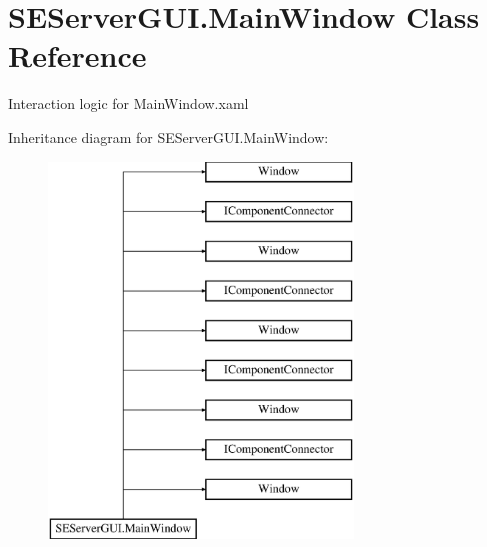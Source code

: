 \hypertarget{class_s_e_server_g_u_i_1_1_main_window}{}\section{S\+E\+Server\+G\+U\+I.\+Main\+Window Class Reference}
\label{class_s_e_server_g_u_i_1_1_main_window}


Interaction logic for Main\+Window.\+xaml  


Inheritance diagram for S\+E\+Server\+G\+U\+I.\+Main\+Window\+:\begin{figure}[H]
\begin{center}
\leavevmode
\includegraphics[height=10.000000cm]{class_s_e_server_g_u_i_1_1_main_window}
\end{center}
\end{figure}
